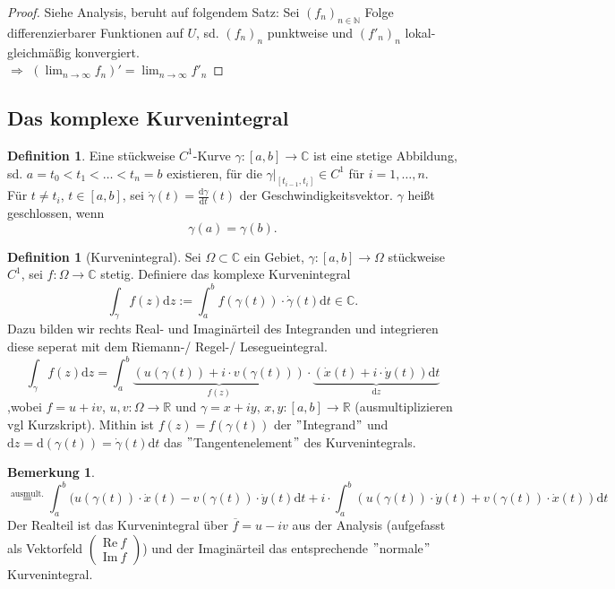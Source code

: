 \documentclass[11pt,titlepage]{article}
\theoremstyle{definition}
\newtheorem{definition}[theorem]{Definition}
\newtheorem{remark}{Bemerkung}
\theoremstyle{remark}
\begin{document}
	\begin{proof}
		Siehe Analysis, beruht auf folgendem Satz: Sei $(f_n)_{n\in\mathbb{N}}$ Folge differenzierbarer 
		Funktionen auf $U$, sd. $(f_n)_n$ punktweise und $(f'_n)_n$ lokal-gleichmäßig konvergiert. \\
		$\Rightarrow$ $(\lim_{n\to\infty} f_n)'=\lim_{n\to\infty}f'_n$
	\end{proof}
	
	\subsection{Das komplexe Kurvenintegral}
	
	\begin{definition}
		Eine stückweise $C^1$-Kurve $\gamma:[a,b]\to\mathbb{C}$ ist eine stetige Abbildung, sd. 
		$a=t_0 < t_1 <\ldots<t_n=b$ existieren, für die $\gamma |_{ [t_{i-1},t_i]}\in C^1$ für 
		$i=1,\ldots ,n$. \\
		Für $t\neq t_i$, $t\in [a,b]$, sei $\dot{\gamma}(t)=\frac{\mathrm{d}\gamma}{\mathrm{d}t}(t)$ der 
		Geschwindigkeitsvektor. $\gamma$ heißt geschlossen, wenn \[\gamma(a)=\gamma(b).\]
	\end{definition}
	
	\begin{definition}[Kurvenintegral]
		Sei $\Omega\subset\mathbb{C}$ ein Gebiet, $\gamma:[a,b]\to\Omega$ stückweise $C^1$, sei 
		$f:\Omega\to\mathbb{C}$ stetig. Definiere das komplexe Kurvenintegral
		\[ \int_{\gamma} f(z)\mathrm{d}z :=\int_a^b f(\gamma(t))\cdot \dot{\gamma}(t) 
		\mathrm{d}t \in \mathbb{C}. \]
		Dazu bilden wir rechts Real- und Imaginärteil des Integranden und 
		integrieren diese seperat mit dem Riemann-/ Regel-/ Lesegueintegral.
		\[ \int_{\gamma} f(z)\mathrm{d}z =\int_a^b \underbrace{(u(\gamma(t))+i\cdot v(\gamma(t)))}_{f(z)}
		\cdot \underbrace{(\dot{x}(t)+i\cdot \dot{y}(t))\mathrm{d}t}_{\mathrm{d}z} \]
		,wobei $f=u+iv$, $u,v:\Omega\to\mathbb{R}$ und $\gamma =x+iy$, $x,y:[a,b]\to\mathbb{R}$ 
		(ausmultiplizieren vgl Kurzskript).  Mithin ist $f(z)=f(\gamma(t))$ der $"$Integrand$"$ und 
		$\mathrm{d}z=\mathrm{d}(\gamma(t))=\dot{\gamma}(t)\mathrm{d}t$ das 
		$"$Tangentenelement$"$ des Kurvenintegrals.
	\end{definition}
	
	\begin{remark}
		\[\overset{\text{ausmult.}}{=} \int_a^b (u(\gamma(t))\cdot \dot{x}(t)-v(\gamma(t))\cdot\dot{y}(t)
		\mathrm{d}t+i\cdot \int_a^b (u(\gamma(t))\cdot \dot{y}(t)+v(\gamma(t))\cdot\dot{x}(t))\mathrm{d}t\]
		Der Realteil ist das Kurvenintegral über $\overline{f}=u-iv$ aus der Analysis (aufgefasst als 
		Vektorfeld $\begin{pmatrix} \text{Re}\ f \\ \text{Im}\ f \end{pmatrix}$) und der Imaginärteil 
		das entsprechende $"$normale$"$ Kurvenintegral.
	\end{remark}
	
\end{document}
